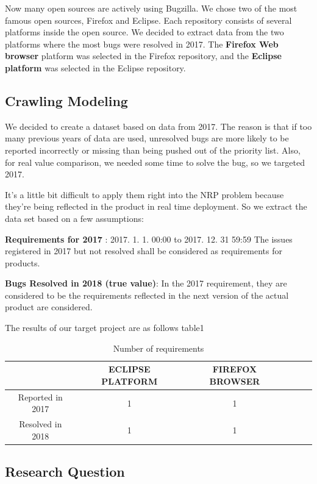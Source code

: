 Now many open sources are actively using Bugzilla. We chose two of the most famous open sources, Firefox and Eclipse. Each repository consists of several platforms inside the open source. We decided to extract data from the two platforms where the most bugs were resolved in 2017. The \textbf{Firefox Web browser} platform was selected in the Firefox repository, and the \textbf{Eclipse platform} was selected in the Eclipse repository.


\subsection{Crawling Modeling}

We decided to create a dataset based on data from 2017. The reason is that if too many previous years of data are used, unresolved bugs are more likely to be reported incorrectly or missing than being pushed out of the priority list. Also, for real value comparison, we  needed some time to solve the bug, so we targeted 2017.

It's a little bit difficult to apply them right into the NRP problem because they're being reflected in the product in real time deployment. So we extract the data set based on a few assumptions:

\textbf{Requirements for 2017} : 2017. 1. 1. 00:00 to 2017. 12. 31 59:59 The issues registered in 2017 but not resolved shall be considered as requirements for products.

\textbf{Bugs Resolved in 2018 (true value)}: In the 2017 requirement, they are considered to be the requirements reflected in the next version of the actual product are considered.

The results of our target project are as follows table1
\begin{table} [H]
  \caption{Number of requirements}
  \label{tab:commands}
  \begin{tabular}{cccccl}
    \toprule
    &ECLIPSE PLATFORM&FIREFOX BROWSER\\
    \midrule
    Reported in 2017& 1 & 1 \\
    Resolved in 2018 & 1&1 \\
    \bottomrule
  \end{tabular}
\label{table:Dataset}
\end{table}


\subsection{Research Question}

